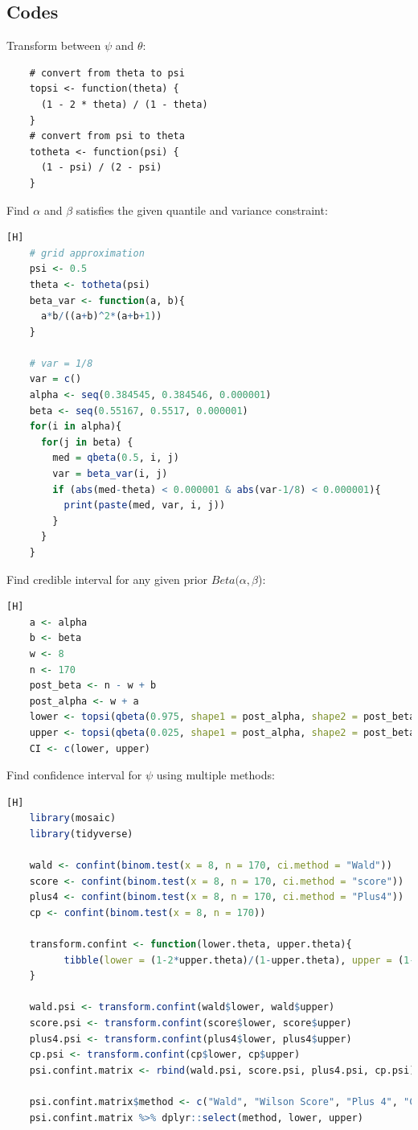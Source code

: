 \documentclass[12pt]{amsart}
\begin{document}
\subsection{Codes}
\singlespacing
Transform between $\psi$ and $\theta$:
\begin{lstlisting}
    # convert from theta to psi
    topsi <- function(theta) {
      (1 - 2 * theta) / (1 - theta)
    }
    # convert from psi to theta
    totheta <- function(psi) {
      (1 - psi) / (2 - psi)
    }
\end{lstlisting}
Find $\alpha$ and $\beta$ satisfies the given quantile and variance constraint:
\label{code: grid}
\begin{lstlisting}[language=R][H]
    # grid approximation
    psi <- 0.5
    theta <- totheta(psi)
    beta_var <- function(a, b){
      a*b/((a+b)^2*(a+b+1))
    }
    
    # var = 1/8 
    var = c()
    alpha <- seq(0.384545, 0.384546, 0.000001)
    beta <- seq(0.55167, 0.5517, 0.000001)
    for(i in alpha){
      for(j in beta) {
        med = qbeta(0.5, i, j)
        var = beta_var(i, j)
        if (abs(med-theta) < 0.000001 & abs(var-1/8) < 0.000001){
          print(paste(med, var, i, j))
        }
      }
    }
\end{lstlisting}
Find credible interval for any given prior $Beta(\alpha, \beta$):
\begin{lstlisting}[language=R][H]
    a <- alpha
    b <- beta
    w <- 8
    n <- 170
    post_beta <- n - w + b
    post_alpha <- w + a
    lower <- topsi(qbeta(0.975, shape1 = post_alpha, shape2 = post_beta))
    upper <- topsi(qbeta(0.025, shape1 = post_alpha, shape2 = post_beta))
    CI <- c(lower, upper)
\end{lstlisting}
Find confidence interval for $\psi$ using multiple methods:
\begin{lstlisting}[language=R][H]
    library(mosaic)
    library(tidyverse)
    
    wald <- confint(binom.test(x = 8, n = 170, ci.method = "Wald"))
    score <- confint(binom.test(x = 8, n = 170, ci.method = "score"))
    plus4 <- confint(binom.test(x = 8, n = 170, ci.method = "Plus4"))
    cp <- confint(binom.test(x = 8, n = 170))
    
    transform.confint <- function(lower.theta, upper.theta){
          tibble(lower = (1-2*upper.theta)/(1-upper.theta), upper = (1-2*lower.theta)/(1-lower.theta))
    }
    
    wald.psi <- transform.confint(wald$lower, wald$upper)
    score.psi <- transform.confint(score$lower, score$upper)
    plus4.psi <- transform.confint(plus4$lower, plus4$upper)
    cp.psi <- transform.confint(cp$lower, cp$upper)
    psi.confint.matrix <- rbind(wald.psi, score.psi, plus4.psi, cp.psi)
    
    psi.confint.matrix$method <- c("Wald", "Wilson Score", "Plus 4", "Clopper Pearson")
    psi.confint.matrix %>% dplyr::select(method, lower, upper)
\end{lstlisting}
\end{document}
